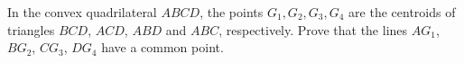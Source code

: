 In the convex quadrilateral $ABCD$, the points $G_1,G_2,G_3,G_4$ are the centroids of triangles $BCD$, $ACD$, $ABD$ and $ABC$, respectively. Prove that the lines $AG_1$, $BG_2$, $CG_3$, $DG_4$ have a common point.
